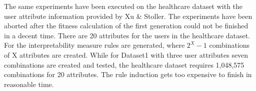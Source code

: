The same experiments have been executed on the healthcare dataset with the user attribute information provided by Xu \& Stoller\cite{Xu}. The experiments have been aborted after the fitness calculation of the first generation could not be finished in a decent time. There are 20 attributes for the users in the healthcare dataset. For the interpretability measure rules are generated, where $2^X-1$ combinations of X attributes are created. While for Dataset1 with three user attributes seven combinations are created and tested, the healthcare dataset requires 1,048,575 combinations for 20 attributes. The rule induction gets too expensive to finish in reasonable time.
\iffalse
As a separated experiment the Evo-RoleMiner$M$ based on NSGA-II$R$ with weights (third version) has been tested on the Dataset2, where one objective is the minimization of the combined violations count $|G_{conf} + G_{accs}|$ and the second objective is the minimization of function:
\begin{equation}
	F = $|UA + PA|$ - INT + 1
\end{equation}
where $|UA + PA|$ is an normalized user- and permission assignment count and $INT$ the average interpretability of roles. In order to not get negative values the function ends with an addition of one.
\fi